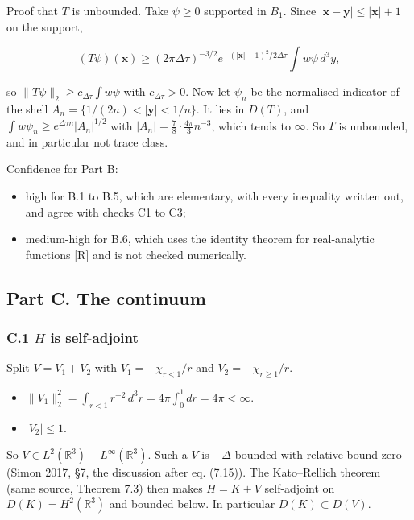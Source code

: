 \documentclass[11pt,a4paper]{article}
\newcommand{\tagmark}[1]{\marginnote{\scriptsize\ttfamily #1}}
\providecommand{\tightlist}{\setlength{\itemsep}{0pt}\setlength{\parskip}{0pt}}
\begin{document}
Proof that \(T\) is unbounded. Take \(\psi\ge0\) supported in \(B_1\). Since \(|\mathbf x-\mathbf y|\le|\mathbf x|+1\) on the support,

\[
(T\psi)(\mathbf x)\ge(2\pi\Delta\tau)^{-3/2}e^{-(|\mathbf x|+1)^2/2\Delta\tau}\int w\psi\,d^3y,
\]

so \(\|T\psi\|_2\ge c_{\Delta\tau}\int w\psi\) with \(c_{\Delta\tau}>0\). Now let \(\psi_n\) be the normalised indicator of the shell \(A_n=\{1/(2n)<|\mathbf y|<1/n\}\). It lies in \(D(T)\), and \(\int w\psi_n\ge e^{\Delta\tau n}|A_n|^{1/2}\) with \(|A_n|=\tfrac78\cdot\tfrac{4\pi}{3}n^{-3}\), which tends to \(\infty\). So \(T\) is unbounded, and in particular not trace class.

Confidence for Part B:

\begin{itemize}
\tightlist
\item
  high for B.1 to B.5, which are elementary, with every inequality written out, and agree with checks C1 to C3;
\item
  medium-high for B.6, which uses the identity theorem for real-analytic functions {[}R{]} and is not checked numerically.
\end{itemize}

\hypertarget{part-c.-the-continuum}{%
\subsection{Part C. The continuum}\label{part-c.-the-continuum}}

\hypertarget{c.1-h-is-self-adjoint}{%
\subsubsection{\texorpdfstring{C.1 \(H\) is self-adjoint}{C.1 H is self-adjoint}}\label{c.1-h-is-self-adjoint}}

\tagmark{[V]} Split \(V=V_1+V_2\) with \(V_1=-\chi_{r<1}/r\) and \(V_2=-\chi_{r\ge1}/r\).

\begin{itemize}
\tightlist
\item
  \(\|V_1\|_2^2=\int_{r<1}r^{-2}\,d^3r=4\pi\int_0^1dr=4\pi<\infty\).
\item
  \(|V_2|\le1\).
\end{itemize}

So \(V\in L^2(\mathbb R^3)+L^\infty(\mathbb R^3)\). Such a \(V\) is \(-\Delta\)-bounded with relative bound zero (Simon 2017, §7, the discussion after eq. (7.15)). The Kato--Rellich theorem (same source, Theorem 7.3) then makes \(H=K+V\) self-adjoint on \(D(K)=H^2(\mathbb R^3)\) and bounded below. In particular \(D(K)\subset D(V)\).
\end{document}
